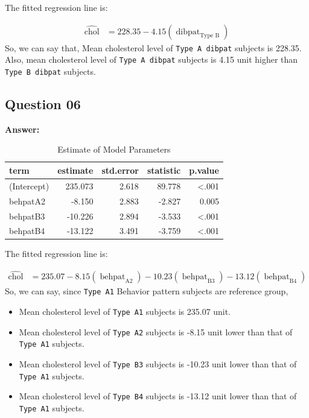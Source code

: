 \documentclass[
  12pt,
  oneside]{article}
\providecommand{\tightlist}{%
  \setlength{\itemsep}{0pt}\setlength{\parskip}{0pt}}
\begin{document}
The fitted regression line is:

\begin{equation}
\label{eq: eq2}
\begin{aligned}
\operatorname{\widehat{chol}} &= 228.35 - 4.15(\operatorname{dibpat}_{\operatorname{Type\ B}})
\end{aligned}
\end{equation}
So, we can say that, Mean cholesterol level of \texttt{Type\ A\ dibpat} subjects is 228.35. Also, mean cholesterol level of \texttt{Type\ A\ dibpat} subjects is 4.15 unit higher than \texttt{Type\ B\ dibpat} subjects.

\hypertarget{question-06}{%
\subsection{Question 06}\label{question-06}}

\textbf{Answer:}

\begin{table}[H]

\caption{\label{tab:Table-08}Estimate of Model Parameters}
\centering
\begin{tabular}[t]{lrrrr}
\toprule
term & estimate & std.error & statistic & p.value\\
\midrule
(Intercept) & 235.073 & 2.618 & 89.778 & <.001\\
behpatA2 & -8.150 & 2.883 & -2.827 & 0.005\\
behpatB3 & -10.226 & 2.894 & -3.533 & <.001\\
behpatB4 & -13.122 & 3.491 & -3.759 & <.001\\
\bottomrule
\end{tabular}
\end{table}

The fitted regression line is:

\begin{equation}
\label{eq: eq3}
\begin{aligned}
\operatorname{\widehat{chol}} &= 235.07 - 8.15(\operatorname{behpat}_{\operatorname{A2}}) - 10.23(\operatorname{behpat}_{\operatorname{B3}}) - 13.12(\operatorname{behpat}_{\operatorname{B4}})
\end{aligned}
\end{equation}
So, we can say, since \texttt{Type\ A1} Behavior pattern subjects are reference group,

\begin{itemize}
\tightlist
\item
  Mean cholesterol level of \texttt{Type\ A1} subjects is 235.07 unit.
\item
  Mean cholesterol level of \texttt{Type\ A2} subjects is -8.15 unit lower than that of \texttt{Type\ A1} subjects.
\item
  Mean cholesterol level of \texttt{Type\ B3} subjects is -10.23 unit lower than that of \texttt{Type\ A1} subjects.
\item
  Mean cholesterol level of \texttt{Type\ B4} subjects is -13.12 unit lower than that of \texttt{Type\ A1} subjects.
\end{itemize}
\end{document}
